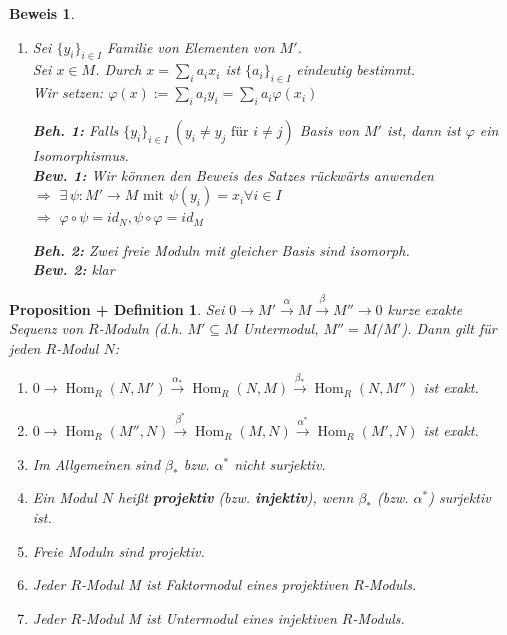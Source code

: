 \documentclass[a4paper,12pt]{scrbook}
\theoremstyle{break}
\newtheorem{PropDef}[Def]{Proposition + Definition}
\theoremstyle{nonumberbreak}
\newtheorem{Bew}{Beweis}
\theoremstyle{nonumberplain}
\newcommand{\emp}[1]{\textbf{\emph{#1}}}
\DeclareMathOperator{\Hom}{Hom}
\begin{document}
\begin{Bew}
  \begin{enumerate}
    \item[(f)] Sei $\{y_i\}_{i \in I}$ Familie von Elementen von $M'$.\\
      Sei $x \in M$. Durch $x=\sum_{i}a_ix_i$ ist $\{a_i\}_{i  \in I}$
      eindeutig bestimmt.\\
      Wir setzen: $\varphi(x):=\sum_i a_iy_i=\sum_ia_i\varphi(x_i)$

      \textbf{Beh. 1:} Falls $\{y_i\}_{i\in I}\;(y_i \neq y_j \text{ für } i\neq
      j)$ Basis von $M'$ ist, dann ist $\varphi$ ein Isomorphismus.\\
      \textbf{Bew. 1:} Wir können den Beweis des Satzes rückwärts anwenden\\
      $\Rightarrow$ $\exists\, \psi: M' \rightarrow M \text{ mit } \psi(y_i)=x_i \forall i \in I$\\
      $\Rightarrow$ $\varphi \circ \psi = id_N, \psi \circ \varphi = id_M$

      \textbf{Beh. 2:} Zwei freie Moduln mit gleicher Basis sind isomorph.\\
      \textbf{Bew. 2:} klar
  \end{enumerate}
\end{Bew}

\begin{PropDef}
  Sei $0 \to M' \overset{\alpha}{\to} M \overset{\beta}{\to} M'' \to 0$ kurze exakte Sequenz von $R$-Moduln (d.h.
  $M' \subseteq M$ Untermodul, $M'' = M/M'$). Dann gilt für jeden $R$-Modul $N$:
  \begin{enumerate}
    \item $0 \to \Hom_R(N,M') \overset{\alpha_*}{\to} \Hom_R(N,M) \overset{\beta_*}{\to}
          \Hom_R(N,M'')$ ist exakt.
    \item $0 \to \Hom_R(M'',N) \overset{\beta^*}{\to} \Hom_R(M,N) \overset{\alpha^*}{\to}
          \Hom_R(M',N)$ ist exakt.
    \item Im Allgemeinen sind $\beta_*$ bzw. $\alpha^*$ nicht surjektiv.
    \item Ein Modul $N$ heißt \emp{projektiv} (bzw.
          \emp{injektiv}), wenn $\beta_*$ (bzw.
          $\alpha^*$) surjektiv ist.
    \item Freie Moduln sind projektiv.
    \item Jeder $R$-Modul M ist Faktormodul eines projektiven $R$-Moduls.
    \item Jeder $R$-Modul M ist Untermodul eines injektiven $R$-Moduls.
  \end{enumerate}
\end{PropDef}
\end{document}
